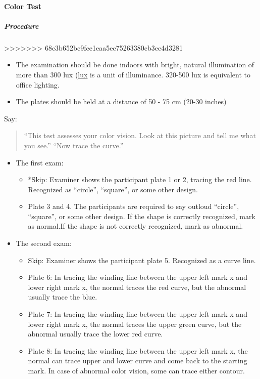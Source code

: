 \documentclass[]{article}
\providecommand{\tightlist}{%
  \setlength{\itemsep}{0pt}\setlength{\parskip}{0pt}}
\let\oldparagraph\paragraph
\renewcommand{\paragraph}[1]{\oldparagraph{#1}\mbox{}}
\let\oldsubparagraph\subparagraph
\renewcommand{\subparagraph}[1]{\oldsubparagraph{#1}\mbox{}}
\begin{document}
\hypertarget{color-test}{%
\paragraph{Color Test}\label{color-test}}

\hypertarget{procedure-1}{%
\subparagraph{Procedure}\label{procedure-1}}
>>>>>>> 68c3b652bc9fce1eaa5ec75263380cb3ee4d3281

\begin{itemize}
\tightlist
\item
  The examination should be done indoors with bright, natural
  illumination of more than 300 lux
  (\href{https://en.wikipedia.org/wiki/Lux}{lux} is a unit of
  illuminance. 320-500 lux is equivalent to office lighting.
\item
  The plates should be held at a distance of 50 - 75 cm (20-30 inches)
\end{itemize}

Say:

\begin{quote}
``This test assesses your color vision. Look at this picture and tell me
what you see.'' ``Now trace the curve.''
\end{quote}

\begin{itemize}
\tightlist
\item
  The first exam:

  \begin{itemize}
  \tightlist
  \item
    *Skip: Examiner shows the participant plate 1 or 2, tracing the red
    line. Recognized as ``circle'', ``square'', or some other design.
  \item
    Plate 3 and 4. The participants are required to say outloud
    ``circle'', ``square'', or some other design. If the shape is
    correctly recognized, mark as normal.If the shape is not correctly
    recognized, mark as abnormal.
  \end{itemize}
\item
  The second exam:

  \begin{itemize}
  \tightlist
  \item
    Skip: Examiner shows the participant plate 5. Recognized as a curve
    line.
  \item
    Plate 6: In tracing the winding line between the upper left mark x
    and lower right mark x, the normal traces the red curve, but the
    abnormal usually trace the blue.
  \item
    Plate 7: In tracing the winding line between the upper left mark x
    and lower right mark x, the normal traces the upper green curve, but
    the abnormal usually trace the lower red curve.
  \item
    Plate 8: In tracing the winding line between the upper left mark x,
    the normal can trace upper and lower curve and come back to the
    starting mark. In case of abnormal color vision, some can trace
    either contour.
  \end{itemize}
\end{itemize}
\end{document}

